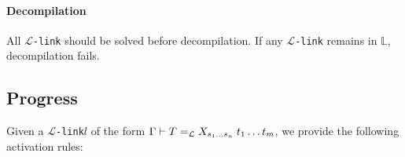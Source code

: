 \documentclass[sigconf,natbib=false,review]{acmart}
\newcommand{\llambda}{\ensuremath{\mathcal{L}}\xspace}
\newcommand{\linkMacro}[1]{\ensuremath{#1}\texttt{-link}\xspace}
\newcommand{\linkbeta}{\linkMacro{\llambda}}
\newcommand{\linkbetaM}[3]{\ensuremath{#1 \vdash #2 =_{\llambda} #3}}
\newcommand{\rhs}{rhs\xspace}
\newcommand{\linkStore}{\texorpdfstring{\ensuremath{\mathbb{L}}\xspace}{L}}
\begin{document}


\paragraph{Decompilation}
All \linkbeta should be solved before decompilation.
If any \linkbeta remains in \linkStore, decompilation fails.

\subsection{Progress}

\newcommand{\progBetaLL}{\emph{\llambda-progress-refine}\xspace}
\newcommand{\progBetaRH}{\emph{\llambda-progress-\rhs}\xspace}
\newcommand{\progBetaFail}{\emph{\llambda-progress-fail}\xspace}

Given a \linkbeta $l$ of the form \linkbetaM{\Gamma}{T}{\rhsBeta}, we provide
the following activation rules:
\end{document}
